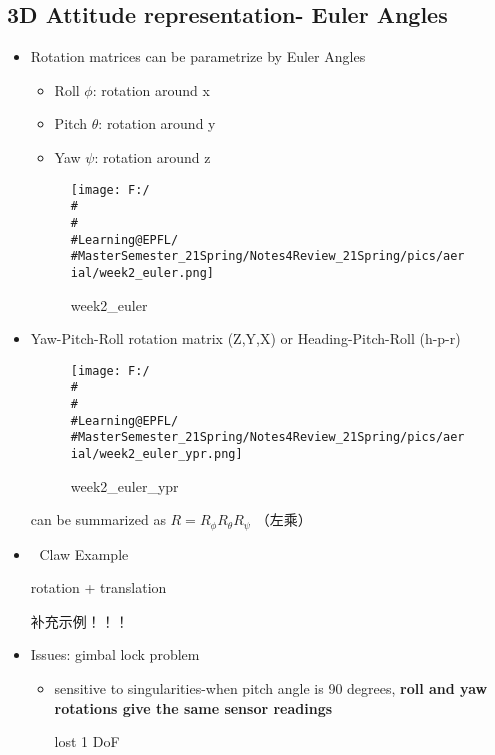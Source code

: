 \documentclass[]{article}
\begin{document}
\subsection{3D Attitude representation- Euler Angles}\label{header-n458}

\begin{itemize}
\item
  Rotation matrices can be parametrize by Euler Angles

  \begin{itemize}
  \item
    Roll \(\phi\): rotation around x
  \item
    Pitch \(\theta\): rotation around y
  \item
    Yaw \(\psi\): rotation around z
  \end{itemize}

  \begin{figure}
  \centering
  \texttt{[image: F:/\\\#\\\#\\\#Learning@EPFL/\\\#MasterSemester\_21Spring/Notes4Review\_21Spring/pics/aerial/week2\_euler.png]}
  \caption{week2\_euler}
  \end{figure}
\item
  Yaw-Pitch-Roll rotation matrix (Z,Y,X) or Heading-Pitch-Roll (h-p-r)

  \begin{figure}
  \centering
  \texttt{[image: F:/\\\#\\\#\\\#Learning@EPFL/\\\#MasterSemester\_21Spring/Notes4Review\_21Spring/pics/aerial/week2\_euler\_ypr.png]}
  \caption{week2\_euler\_ypr}
  \end{figure}

  can be summarized as \(R=R_{\phi} R_{\theta} R_{\psi}\) （左乘）
\item
  🚧 Claw Example

  rotation + translation

  补充示例！！！
\item
  Issues: gimbal lock problem

  \begin{itemize}
  \item
    sensitive to singularities-when pitch angle is 90 degrees,
    \textbf{roll and yaw} \textbf{rotations give the same sensor
    readings}

    lost 1 DoF


\end{itemize}
\end{itemize}
\end{document}
